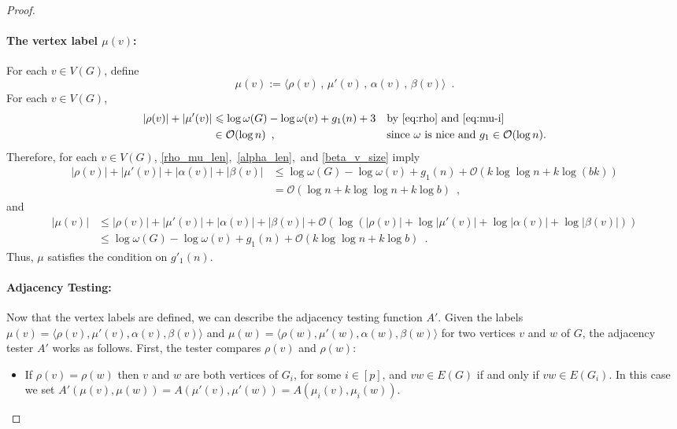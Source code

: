 \documentclass{patmorin}
\let\eqref\cref
\renewcommand{\le}{\leqslant}
\renewcommand{\leq}{\leqslant}
\newcommand{\Oh}{\mathcal{O}}
\begin{document}
\begin{proof}
    \paragraph{\boldmath The vertex label $\mu(v)$:}
    For each $v\in V(G)$, define
    \[
      \mu(v):=
        \langle \rho(v)\,,\, \mu'(v)\,,\, \alpha(v)\,,\, \beta(v) \rangle \enspace .
    \]
For each $v\in V(G)$,  
    \begin{align}
       |\rho(v)|+|\mu'(v)|
       & \le \log\omega(G)-\log\omega(v)+g_1(n)+3&&\textrm{by~\eqref{eq:rho} and~\eqref{eq:mu-i}} \label{rho_mu_len} \\
       & \in \Oh(\log n) \enspace , &&\textrm{since $\omega$ is nice and $g_1\in\Oh(\log n)$.}
       \label{rho_mu_len_x}
    \end{align}
     Therefore, for each $v\in V(G)$, \eqref{rho_mu_len},~\eqref{alpha_len},~and \eqref{beta_v_size} imply
    \begin{align*}
      |\rho(v)|+|\mu'(v)| + |\alpha(v)| + |\beta(v)|
      &\leq
      \log\omega(G)-\log\omega(v) + g_1(n) + \Oh(k\log\log n+k\log(bk))\\
      &=\Oh(\log n + k\log\log n+k\log b)\enspace,
      \end{align*}
      and
      \begin{align*}
      |\mu(v)| &\leq |\rho(v)|+|\mu'(v)| + |\alpha(v)| + |\beta(v)| + \Oh(\log(|\rho(v)|+\log|\mu'(v)| + \log|\alpha(v)| + \log|\beta(v)|))\\
      &\leq \log\omega(G)-\log\omega(v) + g_1(n) + \Oh(k\log\log n+k\log b) \enspace .
    \end{align*}
    Thus, $\mu$ satisfies the condition on $g'_1(n)$.

     \paragraph{Adjacency Testing:}
     Now that the vertex labels are defined, we can describe the adjacency testing function $A'$.
     Given the labels $\mu(v)=\langle\rho(v),\mu'(v),\alpha(v),\beta(v)\rangle$ and $\mu(w)=\langle\rho(w),\mu'(w),\alpha(w),\beta(w)\rangle$ for two vertices $v$ and $w$ of $G$, the adjacency tester $A'$ works as follows. First, the tester compares $\rho(v)$ and $\rho(w)$:
     \begin{itemize}
       \item If $\rho(v)=\rho(w)$ then $v$ and $w$ are both vertices of $G_i$, for some $i\in[p]$, and $vw\in E(G)$ if and only if $vw\in E(G_i)$.  In this case we set $A'(\mu(v),\mu(w))=A(\mu'(v),\mu'(w))=A(\mu_i(v),\mu_i(w))$.


\end{itemize}
\end{proof}
\end{document}

